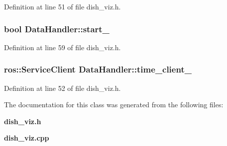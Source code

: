 \-Definition at line 51 of file dish\-\_\-viz.\-h.

\subsubsection[{start\-\_\-}]{\setlength{\rightskip}{0pt plus 5cm}bool {\bf \-Data\-Handler\-::start\-\_\-}\hspace{0.3cm}{\ttfamily  [private]}}\label{classDataHandler_a5410141c534bf0de36802e362e83eaa2}


\-Definition at line 59 of file dish\-\_\-viz.\-h.

\subsubsection[{time\-\_\-client\-\_\-}]{\setlength{\rightskip}{0pt plus 5cm}ros\-::\-Service\-Client {\bf \-Data\-Handler\-::time\-\_\-client\-\_\-}\hspace{0.3cm}{\ttfamily  [private]}}\label{classDataHandler_aacb6c5c3b1b623865284d77653a3827b}


\-Definition at line 52 of file dish\-\_\-viz.\-h.



\-The documentation for this class was generated from the following files\-:\begin{DoxyCompactItemize}
\item 
{\bf dish\-\_\-viz.\-h}\item 
{\bf dish\-\_\-viz.\-cpp}\end{DoxyCompactItemize}
